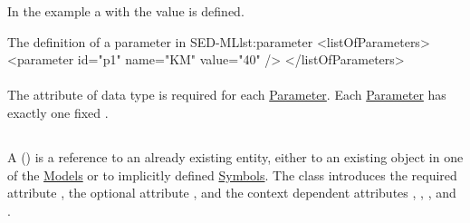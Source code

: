 In the example a   with the value  is defined. 
\begin{myXmlLst}{The definition of a parameter in SED-ML}{lst:parameter}
<listOfParameters>
	<parameter id="p1" name="KM" value="40" />
</listOfParameters>
\end{myXmlLst}


\paragraph*{}
\label{sec:value}
The  attribute of data type  is required for each \hyperref[class:parameter]{Parameter}. Each \hyperref[class:parameter]{Parameter} has exactly one fixed .

\subsection{}
\label{class:variable}
A  () is a reference to an already existing entity, either to an existing object in one of the \hyperref[class:model]{Models} or to implicitly defined \hyperref[sec:symbol]{Symbols}. The  class introduces the required attribute \hyperref[sec:id]{}, the optional attribute \hyperref[sec:name]{}, and the context dependent attributes \hyperref[sec:target]{}, \hyperref[sec:symbol]{}, \hyperref[sec:taskReferenceAttribute]{}, and \hyperref[sec:modelReferenceAttribute]{}.

